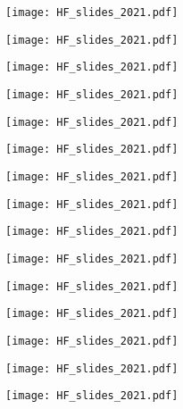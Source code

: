 \documentclass[main.tex]{subfiles}
\begin{document}
\texttt{[image: HF\_slides\_2021.pdf]}

\texttt{[image: HF\_slides\_2021.pdf]}

\texttt{[image: HF\_slides\_2021.pdf]}

\texttt{[image: HF\_slides\_2021.pdf]}

\texttt{[image: HF\_slides\_2021.pdf]}

\texttt{[image: HF\_slides\_2021.pdf]}

\texttt{[image: HF\_slides\_2021.pdf]}

\texttt{[image: HF\_slides\_2021.pdf]}

\texttt{[image: HF\_slides\_2021.pdf]}

\texttt{[image: HF\_slides\_2021.pdf]}

\texttt{[image: HF\_slides\_2021.pdf]}

\texttt{[image: HF\_slides\_2021.pdf]}

\texttt{[image: HF\_slides\_2021.pdf]}

\texttt{[image: HF\_slides\_2021.pdf]}

\texttt{[image: HF\_slides\_2021.pdf]}
\end{document}
